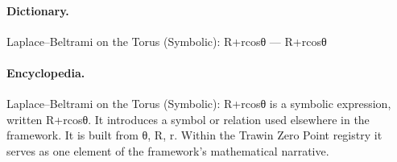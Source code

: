 \paragraph{Dictionary.}
Laplace–Beltrami on the Torus (Symbolic): R+rcosθ — R+rcosθ

\paragraph{Encyclopedia.}
Laplace–Beltrami on the Torus (Symbolic): R+rcosθ is a symbolic expression, written R+rcosθ. It introduces a symbol or relation used elsewhere in the framework. It is built from θ, R, r. Within the Trawin Zero Point registry it serves as one element of the framework's mathematical narrative.
